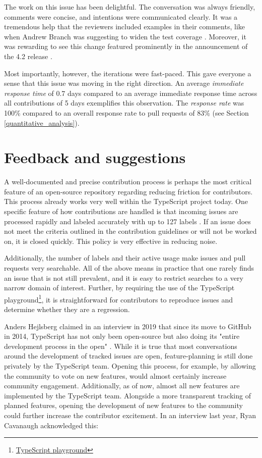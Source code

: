 \documentclass[12pt]{scrartcl}
\begin{document}
The work on this issue has been delightful. The conversation was always friendly, comments were concise, and intentions were communicated clearly. It was a tremendous help that the reviewers included examples in their comments, like when Andrew Branch was suggesting to widen the test coverage \cite{41928Comment4}. Moreover, it was rewarding to see this change featured prominently in the announcement of the 4.2 release \cite{TypeScript4.2Changelog}.

Most importantly, however, the iterations were fast-paced. This gave everyone a sense that this issue was moving in the right direction. An average \textit{immediate response time} of 0.7 days compared to an average immediate response time across all contributions of 5 days exemplifies this observation. The \textit{response rate} was 100\% compared to an overall response rate to pull requests of 83\% (see Section \ref{quantitative_analysis}).

\section{Feedback and suggestions}
\label{feedback}

A well-documented and precise contribution process is perhaps the most critical feature of an open-source repository regarding reducing friction for contributors. This process already works very well within the TypeScript project today. One specific feature of how contributions are handled is that incoming issues are processed rapidly and labeled accurately with up to 127 labels \cite{TypeScriptLabels}. If an issue does not meet the criteria outlined in the contribution guidelines or will not be worked on, it is closed quickly. This policy is very effective in reducing noise.

Additionally, the number of labels and their active usage make issues and pull requests very searchable. All of the above means in practice that one rarely finds an issue that is not still prevalent, and it is easy to restrict searches to a very narrow domain of interest. Further, by requiring the use of the TypeScript playground\footnote{\href{https://www.typescriptlang.org/play}{TypeScript playground}}, it is straightforward for contributors to reproduce issues and determine whether they are a regression.

Anders Hejlsberg claimed in an interview in 2019 that since its move to GitHub in 2014, TypeScript has not only been open-source but also doing its "entire development process in the open" \cite{HejlsbergInterview}. While it is true that most conversations around the development of tracked issues are open, feature-planning is still done privately by the TypeScript team. Opening this process, for example, by allowing the community to vote on new features, would almost certainly increase community engagement. Additionally, as of now, almost all new features are implemented by the TypeScript team. Alongside a more transparent tracking of planned features, opening the development of new features to the community could further increase the contributor excitement. In an interview last year, Ryan Cavanaugh acknowledged this:
\end{document}
